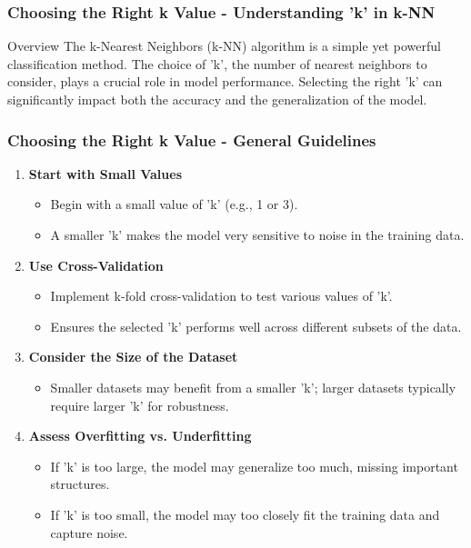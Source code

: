 \documentclass[aspectratio=169]{beamer}
\begin{document}
\begin{frame}[fragile]
    \frametitle{Choosing the Right k Value - Understanding 'k' in k-NN}
    \begin{block}{Overview}
        The k-Nearest Neighbors (k-NN) algorithm is a simple yet powerful classification method. 
        The choice of 'k', the number of nearest neighbors to consider, plays a crucial role in model performance. 
        Selecting the right 'k' can significantly impact both the accuracy and the generalization of the model.
    \end{block}
\end{frame}

\begin{frame}[fragile]
    \frametitle{Choosing the Right k Value - General Guidelines}
    \begin{enumerate}
        \item \textbf{Start with Small Values}
        \begin{itemize}
            \item Begin with a small value of 'k' (e.g., 1 or 3). 
            \item A smaller 'k' makes the model very sensitive to noise in the training data.
        \end{itemize}

        \item \textbf{Use Cross-Validation}
        \begin{itemize}
            \item Implement k-fold cross-validation to test various values of 'k'.
            \item Ensures the selected 'k' performs well across different subsets of the data.
        \end{itemize}

        \item \textbf{Consider the Size of the Dataset}
        \begin{itemize}
            \item Smaller datasets may benefit from a smaller 'k'; larger datasets typically require larger 'k' for robustness.
        \end{itemize}

        \item \textbf{Assess Overfitting vs. Underfitting}
        \begin{itemize}
            \item If 'k' is too large, the model may generalize too much, missing important structures.
            \item If 'k' is too small, the model may too closely fit the training data and capture noise.
        \end{itemize}
    \end{enumerate}
\end{frame}
\end{document}
